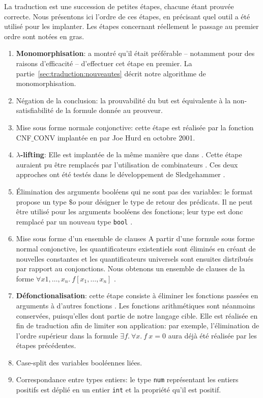 La traduction est une succession de petites étapes, chacune étant
prouvée correcte. Nous présentons ici l'ordre de ces étapes, en
précisant quel outil a été utilisé pour les implanter. Les étapes
concernant réellement le passage au premier ordre sont notées en gras.
\begin{enumerate}
\item \textbf{Monomorphisation}: \cite{MengP08} a montré qu'il était
  préférable -- notamment pour des raisons d'efficacité -- d'effectuer
  cet étape en premier. La
  partie~\ref{sec:traduction:nouveautes} décrit notre
  algorithme de monomorphisation.
  \item Négation de la conclusion: la prouvabilité du but est
    équivalente à la non-satisfiabilité de la formule donnée au
    prouveur.
  \item Mise sous forme normale conjonctive: cette étape est réalisée
    par la fonction \textsf{CNF$\_$CONV} implantée en \holfour par Joe
    Hurd en octobre 2001.
  \item \textbf{$\lambda$-lifting}: Elle est implantée de la même manière que dans \cite{Bohme12}.  Cette étape auraient pu être remplacés par l'utilisation de combinateurs \cite{Hurd03}. Ces deux approches ont été testés dans le développement de Sledgehammer \cite{MengP08}.
  \item Élimination des arguments booléens qui ne sont pas des
    variables: le format \tff propose un type $\$o$ pour désigner le
    type de retour des prédicats. Il ne peut être utilisé pour les
    arguments booléens des fonctions; leur type est donc remplacé par un
    nouveau type \verb!bool! \cite{MengP08}.
  \item Mise sous forme d'un ensemble de clauses
    A partir d'une formule sous forme normal conjonctive, les quantificateurs existentiels sont éliminés en créant de nouvelles constantes et les quantificateurs universels sont ensuites distribués par rapport au conjonctions. Nous obtenons un ensemble de clauses de la forme $\forall x1,\ldots,x_n.\ f[x_1,\ldots,x_n]$ .
  \item \textbf{Défonctionalisation}: cette étape consiste à éliminer
    les fonctions passées en arguments à d'autres fonctions \cite{Hurd03}\cite{MengP08}.
    Les fonctions arithmétiques sont néanmoins conservées, puisqu'elles
    dont partie de notre langage cible. Elle est réalisée en fin de
    traduction afin de limiter son application: par exemple,
    l'élimination de l'ordre supérieur dans la formule $\exists f.\
    \forall x.\ f\ x = 0$ aura déjà été réalisée par les étapes
    précédentes.
  \item Case-split des variables booléennes liées.
  \item Correspondance entre types entiers: le type \holfour \verb!num!
    représentant les entiers positifs est déplié en un entier \verb!int!
    et la propriété qu'il est positif.
\end{enumerate}

